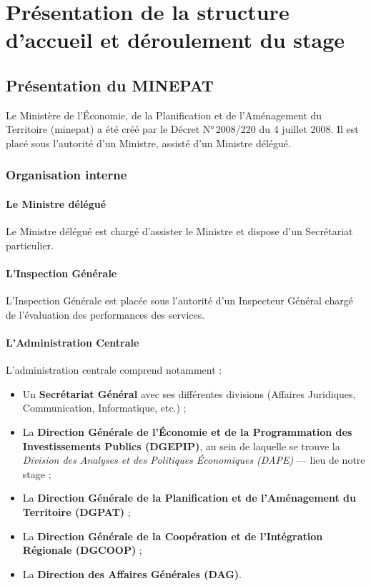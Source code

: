 \documentclass[12pt, a4paper, oneside]{report}
\begin{document}
\chapter{Présentation de la structure d'accueil et déroulement du stage}
\label{chap:structure}

\section{Présentation du MINEPAT}
\label{sec:minepat}

Le Ministère de l'Économie, de la Planification et de l'Aménagement du Territoire (\gls{minepat}) a été créé par le Décret N°\,2008/220 du 4 juillet 2008. Il est placé sous l'autorité d'un Ministre, assisté d'un Ministre délégué.

\subsection{Organisation interne}

\subsubsection{Le Ministre délégué}

Le Ministre délégué est chargé d'assister le Ministre et dispose d'un Secrétariat particulier.

\subsubsection{L'Inspection Générale}

L'Inspection Générale est placée sous l'autorité d'un Inspecteur Général chargé de l'évaluation des performances des services.

\subsubsection{L'Administration Centrale}

L'administration centrale comprend notamment :

\begin{itemize}
  \item Un \textbf{Secrétariat Général} avec ses différentes divisions (Affaires Juridiques, Communication, Informatique, etc.) ;
  \item La \textbf{Direction Générale de l'Économie et de la Programmation des Investissements Publics (DGEPIP)}, au sein de laquelle se trouve la \textit{Division des Analyses et des Politiques Économiques (DAPE)} — lieu de notre stage ;
  \item La \textbf{Direction Générale de la Planification et de l'Aménagement du Territoire (DGPAT)} ;
  \item La \textbf{Direction Générale de la Coopération et de l'Intégration Régionale (DGCOOP)} ;
  \item La \textbf{Direction des Affaires Générales (DAG)}.
\end{itemize}
\end{document}
